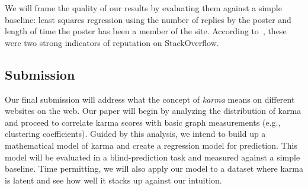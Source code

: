 \documentclass[10pt]{article}
\begin{document}
We will frame the quality of our results by evaluating them against a simple
baseline: least squares regression using the number of replies by the poster and
length of time the poster has been a member of the site. According
to~\citet{movshovitzanalysis}, these were two strong indicators of reputation on
StackOverflow. 

\subsection{Submission}

Our final submission will address what the concept of \textit{karma} means on
different websites on the web. Our paper will begin by analyzing the
distribution of karma and proceed to correlate karma scores with basic graph
measurements (e.g., clustering coefficients). Guided by this analysis, we intend
to build up a mathematical model of karma and create a regression model for
prediction. This model will be evaluated in a blind-prediction task and measured
against a simple baseline. Time permitting, we will also apply our
model to a dataset where karma is latent and see how well it stacks up
against our intuition.



\end{document}
